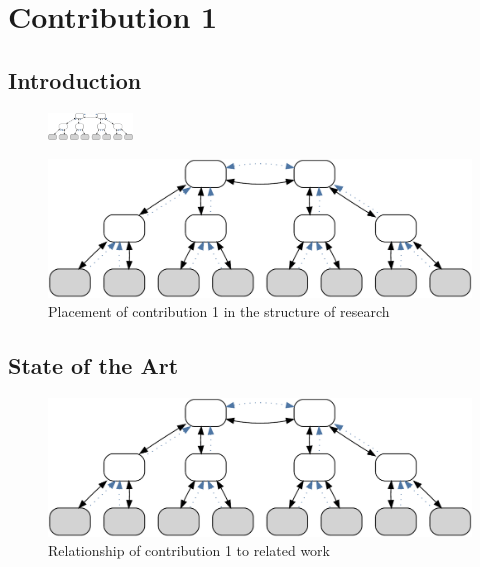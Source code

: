 \cleardoublepage
\chapter{Contribution 1}\label{sec:contrib1}\minitoc\vspace{.5cm}

\section{Introduction}

\begin{figure}
    \centering
    \includegraphics[width=0.2\textwidth]{resources/images/example3}
\end{figure}



\begin{figure}[H]
    \centering
    \includegraphics[width=.55\textwidth]{resources/images/example3}
    \caption{Placement of contribution 1 in the structure of research}\label{fig:hourglass:contrib1}
\end{figure}

\section{State of the Art}


\begin{figure}[htbp]
    \centering
    \includegraphics[width=.6\textwidth]{resources/images/example3}
    \caption{Relationship of contribution 1 to related work}\label{fig:contrib1:related}
\end{figure}

